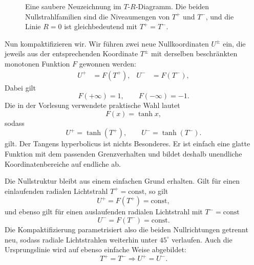 \begin{figure}[htbp]\centering
{}\caption{Eine saubere Neuzeichnung im \(T\)-\(R\)-Diagramm. Die beiden Nullstrahlfamilien sind die Niveaumengen von \(T^+\) und \(T^-\), und die Linie \(R=0\) ist gleichbedeutend mit \(T^+=T^-\).}\end{figure}

Nun kompaktifizieren wir. Wir führen zwei neue Nullkoordinaten \(U^\pm\) ein, die jeweils aus der entsprechenden Koordinate \(T^\pm\) mit derselben beschränkten monotonen Funktion \(F\) gewonnen werden:
\begin{align}
U^+ &= F(T^+), &
U^- &= F(T^-),
\end{align}
Dabei gilt
\begin{equation}
F(+\infty)=1,
\qquad
F(-\infty)=-1.
\end{equation}
Die in der Vorlesung verwendete praktische Wahl lautet
\begin{equation}
F(x)=\tanh x,
\end{equation}
sodass
\begin{equation}
U^+ = \tanh(T^+),
\qquad
U^- = \tanh(T^-).
\end{equation}
gilt. Der Tangens hyperbolicus ist nichts Besonderes. Er ist einfach eine glatte Funktion mit dem passenden Grenzverhalten und bildet deshalb unendliche Koordinatenbereiche auf endliche ab.

Die Nullstruktur bleibt aus einem einfachen Grund erhalten. Gilt für einen einlaufenden radialen Lichtstrahl \(T^+=\text{const}\), so gilt
\[
U^+=F(T^+)=\text{const},
\]
und ebenso gilt für einen auslaufenden radialen Lichtstrahl mit \(T^-=\text{const}\)
\[
U^-=F(T^-)=\text{const}.
\]
Die Kompaktifizierung parametrisiert also die beiden Nullrichtungen getrennt neu, sodass radiale Lichtstrahlen weiterhin unter \(45^\circ\) verlaufen. Auch die Ursprungslinie wird auf ebenso einfache Weise abgebildet:
\[
T^+=T^- \Longrightarrow U^+=U^-.
\]

